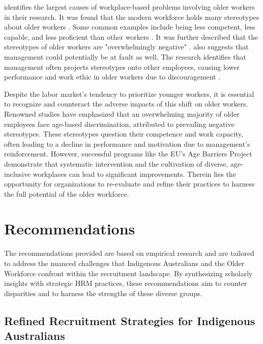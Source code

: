 \documentclass{article}
\begin{document}
\textcite{marchiondoDevelopmentValidationWorkplace2016} identifies the largest causes of workplace-based problems involving older workers in their research. It was found that the modern workforce holds many stereotypes about older workers \parencite{marchiondoDevelopmentValidationWorkplace2016}. Some common examples include being less competent, less capable, and less proficient than other workers \parencite{marchiondoDevelopmentValidationWorkplace2016}. It was further described that the stereotypes of older workers are "overwhelmingly negative" \parencite{marchiondoDevelopmentValidationWorkplace2016}. \cite{marchiondoDevelopmentValidationWorkplace2016} also suggests that management could potentially be at fault as well. The research identifies that management often projects stereotypes onto other employees, causing lower performance and work ethic in older workers due to discouragement \parencite{marchiondoDevelopmentValidationWorkplace2016}.

Despite the labor market's tendency to prioritize younger workers, it is essential to recognize and counteract the adverse impacts of this shift on older workers. Renowned studies have emphasized that an overwhelming majority of older employees face age-based discrimination, attributed to prevailing negative stereotypes. These stereotypes question their competence and work capacity, often leading to a decline in performance and motivation due to management's reinforcement. However, successful programs like the EU's Age Barriers Project demonstrate that systematic intervention and the cultivation of diverse, age-inclusive workplaces can lead to significant improvements. Therein lies the opportunity for organizations to re-evaluate and refine their practices to harness the full potential of the older workforce.

\clearpage
\section{Recommendations}

The recommendations provided are based on empirical research and are tailored to address the nuanced challenges that Indigenous Australians and the Older Workforce confront within the recruitment landscape. By synthesizing scholarly insights with strategic HRM practices, these recommendations aim to counter disparities and to harness the strengths of these diverse groups.

\subsection{Refined Recruitment Strategies for Indigenous Australians}
\end{document}

